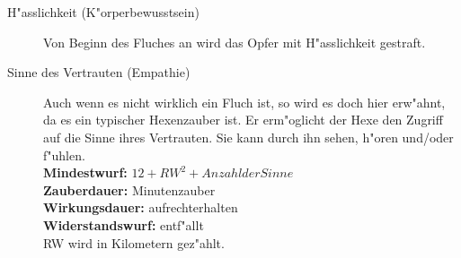 \begin{description}
\item [H"asslichkeit (K"orperbewusstsein)] Von Beginn des Fluches an wird das Opfer mit H"asslichkeit gestraft.
\item [Sinne des Vertrauten (Empathie)] Auch wenn es nicht wirklich ein Fluch ist, so wird es doch hier erw"ahnt, da es ein typischer Hexenzauber ist. Er erm"oglicht der Hexe den Zugriff auf die Sinne ihres Vertrauten. Sie kann durch ihn sehen, h"oren und/oder f"uhlen.\\
\textbf{Mindestwurf:} $ 12+RW^2+Anzahl der Sinne $\\
\textbf{Zauberdauer:} Minutenzauber\\
\textbf{Wirkungsdauer:} aufrechterhalten\\
\textbf{Widerstandswurf:} entf"allt\\
RW wird in Kilometern gez"ahlt.
\end{description}
